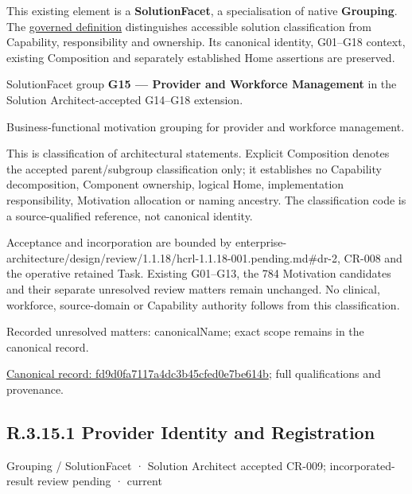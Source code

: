 This existing element is a \textbf{SolutionFacet}, a specialisation of native
\textbf{Grouping}. The \href{\detokenize{../../../../../../../governance/continuum-representation.md#solutionfacet-classification--1119-candidate}}{governed definition}
distinguishes accessible solution classification from Capability, responsibility
and ownership. Its canonical identity, G01–G18 context, existing Composition
and separately established Home assertions are preserved.



SolutionFacet group \textbf{G15 — Provider and Workforce Management} in the Solution Architect-accepted G14–G18 extension.



Business-functional motivation grouping for provider and workforce management.



This is classification of architectural statements. Explicit Composition denotes the accepted parent/subgroup classification only; it establishes no Capability decomposition, Component ownership, logical Home, implementation responsibility, Motivation allocation or naming ancestry. The classification code is a source-qualified reference, not canonical identity.



Acceptance and incorporation are bounded by enterprise-architecture/design/review/1.1.18/hcrl-1.1.18-001.pending.md\#dr-2, CR-008 and the operative retained Task. Existing G01–G13, the 784 Motivation candidates and their separate unresolved review matters remain unchanged. No clinical, workforce, source-domain or Capability authority follows from this classification.


{\small Recorded unresolved matters: canonicalName; exact scope remains in the canonical record.}\par
{\footnotesize \href{../../../../../../../continuum/grouping/fd9d0fa7117a4dc3b45cfed0e7be614b.md}{Canonical record: fd9d0fa7117a4dc3b45cfed0e7be614b}; full qualifications and provenance.}\par
\subsection*{R.3.15.1 Provider Identity and Registration}
\label{navigation:R.3.15.1}

\label{element:a58e87c95bd24c16a1006b217aeac691}
{\small Grouping / SolutionFacet · Solution Architect accepted CR-009; incorporated-result review pending · current}\par

